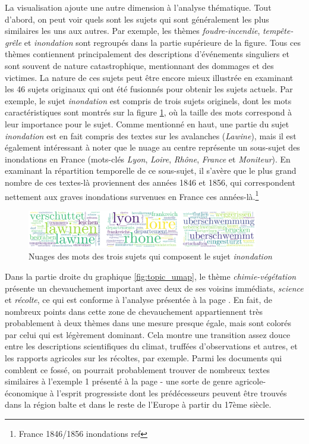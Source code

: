 \documentclass[a4paper,twoside,12pt]{article}
\begin{document}
La visualisation ajoute une autre dimension à l'analyse thématique. Tout d'abord, on peut voir quels sont les sujets qui sont généralement les plus similaires les uns aux autres. Par exemple, les thèmes \textit{foudre-incendie}, \textit{tempête-grêle} et \textit{inondation} sont regroupés dans la partie supérieure de la figure. Tous ces thèmes contiennent principalement des descriptions d'événements singuliers et sont souvent de nature catastrophique, mentionnant des dommages et des victimes. La nature de ces sujets peut être encore mieux illustrée en examinant les 46 sujets originaux qui ont été fusionnés pour obtenir les sujets actuels. Par exemple, le sujet \textit{inondation} est compris de trois sujets originels, dont les mots caractéristiques sont montrés sur la figure \ref{fig:suptopic_worcloud_9}, où la taille des mots correspond à leur importance pour le sujet. Comme mentionné en haut, une partie du sujet \textit{inondation} est en fait compris des textes sur les avalanches (\textit{Lawine}), mais il est également intéressant à noter que le nuage au centre représente un sous-sujet des inondations en France (mots-clés \textit{Lyon}, \textit{Loire}, \textit{Rhône}, \textit{France} et \textit{Moniteur}). En examinant la répartition temporelle de ce sous-sujet, il s'avère que le plus grand nombre de ces textes-là proviennent des années 1846 et 1856, qui correspondent nettement aux graves inondations survenues en France ces années-là.\footnote{France 1846/1856 inondations ref}

\begin{figure}[h]
    \centering
    \includegraphics[width=0.9\textwidth]{images/subtopics_wordcloud_9.pdf}
    \caption{Nuages des mots des trois sujets qui composent le sujet \textit{inondation}}
    \label{fig:suptopic_worcloud_9}
\end{figure}


Dans la partie droite du graphique \ref{fig:topic_umap}, le thème \textit{chimie-végétation} présente un chevauchement important avec deux de ses voisins immédiats, \textit{science} et \textit{récolte}, ce qui est conforme à l'analyse présentée à la page \pageref{topic1_chimie-vegetation}. En fait, de nombreux points dans cette zone de chevauchement appartiennent très probablement à deux thèmes dans une mesure presque égale, mais sont colorés par celui qui est légèrement dominant. Cela montre une transition assez douce entre les descriptions scientifiques du climat, truffées d'observations et autres, et les rapports agricoles sur les récoltes, par exemple. Parmi les documents qui comblent ce fossé, on pourrait probablement trouver de nombreux textes similaires à l'exemple 1 présenté à la page \pageref{topic1_chimie-vegetation} - une sorte de genre agricole-économique à l'esprit progressiste dont les prédécesseurs peuvent être trouvés dans la région balte et dans le reste de l'Europe à partir du 17ème siècle.
\end{document}

